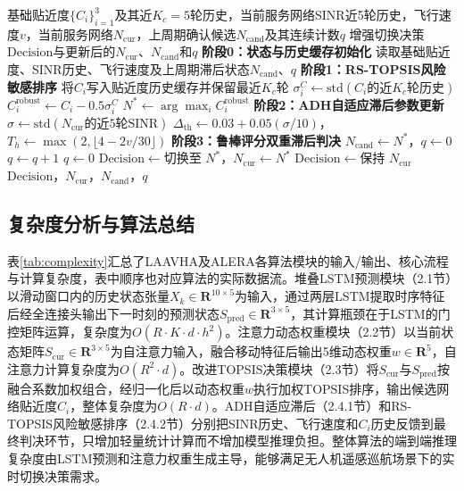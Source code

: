 \documentclass[10pt,a4paper]{ctexart}
\begin{document}
\begin{algorithm}[H]
\caption{ALERA风险感知垂直切换增强流程}
\label{alg:alera}
\small
\begin{algorithmic}[1]
\Require 基础贴近度$\{C_i\}_{i=1}^{3}$及其近$K_c=5$轮历史，当前服务网络SINR近5轮历史，飞行速度$v$，当前服务网络$N_{\mathrm{cur}}$，上周期确认候选$N_{\mathrm{cand}}$及其连续计数$q$
\Ensure 增强切换决策$\mathrm{Decision}$与更新后的$N_{\mathrm{cur}}$、$N_{\mathrm{cand}}$和$q$
\State \textbf{阶段0：状态与历史缓存初始化}
\State 读取基础贴近度、SINR历史、飞行速度及上周期滞后状态$N_{\mathrm{cand}}$、$q$
\State \textbf{阶段1：RS-TOPSIS风险敏感排序}
    \State 将$C_i$写入贴近度历史缓存并保留最近$K_c$轮
    \State $\sigma_i^C\gets\mathrm{std}(C_i\text{的近}K_c\text{轮历史})$
    \State $C_i^{\mathrm{robust}}\gets C_i-0.5\sigma_i^C$
\EndFor
\State $N^*\gets\arg\max_i C_i^{\mathrm{robust}}$
\State \textbf{阶段2：ADH自适应滞后参数更新}
\State $\sigma\gets\mathrm{std}(N_{\mathrm{cur}}\text{的近5轮SINR})$
\State $\Delta_{\mathrm{th}}\gets0.03+0.05(\sigma/10)$，$T_h\gets\max(2,\lfloor4-2v/30\rfloor)$
\State \textbf{阶段3：鲁棒评分双重滞后判决}
    \State $N_{\mathrm{cand}}\gets N^*$，$q\gets0$
\EndIf
{}
    \State $q\gets q+1$
\Else
    \State $q\gets0$
\EndIf
{}
    \State $\mathrm{Decision}\gets\text{切换至 }N^*$，$N_{\mathrm{cur}}\gets N^*$
\Else
    \State $\mathrm{Decision}\gets\text{保持 }N_{\mathrm{cur}}$
\EndIf
\State \Return $\mathrm{Decision}$，$N_{\mathrm{cur}}$，$N_{\mathrm{cand}}$，$q$
\end{algorithmic}
\end{algorithm}

\subsection{复杂度分析与算法总结}

表\ref{tab:complexity}汇总了LAAVHA及ALERA各算法模块的输入/输出、核心流程与计算复杂度，表中顺序也对应算法的实际数据流。堆叠LSTM预测模块（2.1节）以滑动窗口内的历史状态张量$X_k\in\mathbf{R}^{10\times5}$为输入，通过两层LSTM提取时序特征后经全连接头输出下一时刻的预测状态$S_{\mathrm{pred}}\in\mathbf{R}^{3\times5}$，其计算瓶颈在于LSTM的门控矩阵运算，复杂度为$O(R\cdot K\cdot d\cdot h^2)$。注意力动态权重模块（2.2节）以当前状态矩阵$S_{\mathrm{cur}}\in\mathbf{R}^{3\times5}$为自注意力输入，融合移动特征后输出5维动态权重$w\in\mathbf{R}^5$，自注意力计算复杂度为$O(R^2\cdot d)$。改进TOPSIS决策模块（2.3节）将$S_{\mathrm{cur}}$与$S_{\mathrm{pred}}$按融合系数加权组合，经归一化后以动态权重$w$执行加权TOPSIS排序，输出候选网络贴近度$C_i$，整体复杂度为$O(R\cdot d)$。ADH自适应滞后（2.4.1节）和RS-TOPSIS风险敏感排序（2.4.2节）分别把SINR历史、飞行速度和$C_i$历史反馈到最终判决环节，只增加轻量统计计算而不增加模型推理负担。整体算法的端到端推理复杂度由LSTM预测和注意力权重生成主导，能够满足无人机遥感巡航场景下的实时切换决策需求。
\end{document}
